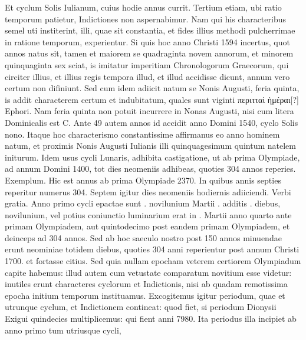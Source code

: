 Et cyclum
Solis Iulianum, cuius hodie annus  currit.
Tertium etiam,
ubi ratio temporum patietur, Indictiones non aspernabimur.
Nam
qui his characteribus semel uti institerint, illi,
 quae sit constantia, et fides
illius methodi pulcherrimae in ratione temporum, experientur.
Si
quis hoc anno Christi 1594 incertus, quot annos natus sit, tamen et
maiorem se quadraginta novem annorum, et minorem quinquaginta
sex sciat, is imitatur imperitiam Chronologorum Graecorum, qui
circiter illius, et illius regis tempora illud,
 et illud accidisse dicunt, annum
vero certum non difiniunt.
Sed cum idem adiicit natum se Nonis
Augusti, feria quinta, is addit characterem certum et indubitatum,
quales sunt viginti \textgreek{περιτταὶ ἡμέραι[?]} Ephori.
Nam feria quinta non
potuit incurrere in Nonas Augusti, nisi cum litera Dominicalis est C.
Ante 49 autem annos id accidit anno Domini 1540, cyclo Solis nono.
Itaque hoc characterismo constantissime affirmanus eo anno hominem
natum, et proximis Nonis Augusti Iulianis illi quinquagesimum
quintum natelem initurum.
Idem usus cycli Lunaris, adhibita
castigatione, ut ab prima Olympiade, ad annum Domini 1400, tot
dies neomeniis adhibeas, quoties 304 annos reperies.
Exemplum.
Hic est annus ab prima Olympiade 2370.
In quibus annis septies reperitur
numerus 304.
Septem igitur dies neomeniis hodiernis adiiciendi.
Verbi gratia.
Anno primo cycli epactae sunt . novilunium
Martii . additis
 . diebus, novilunium, vel potius coniunctio
luminarium erat in .
Martii anno quarto ante primam Olympiadem,
aut quintodecimo post eandem primam Olympiadem, et deinceps
ad 304 annos.
Sed ab hoc saeculo nostro post 150 annos minuendae
erunt neominiae totidem diebus, quoties 304 anni reperientur
post annum Christi 1700. et fortasse citius.
Sed quia nullam epocham
veterem certiorem Olympiadum capite habemus: illud autem
cum vetustate comparatum novitium esse videtur: inutiles erunt characteres
cyclorum et Indictionis, nisi ab quadam remotissima epocha
initium temporum instituamus.
%
Excogitemus igitur periodum,
quae et utrunque cyclum, et Indictionem contineat: quod fiet, si periodum
Dionysii Exigui quindecies multiplicemus: qui fient anni
7980.
Ita periodus illa incipiet ab anno primo tum utriusque cycli,

